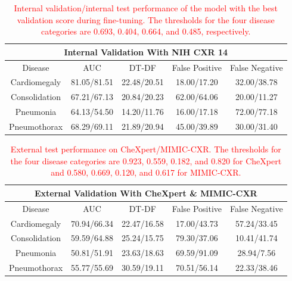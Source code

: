 \documentclass[preprint,7pt, a4paper]{elsarticle}
\begin{document}
\begin{table}
    \centering
    \begin{tabular}{c|cccc}
        \toprule
        \multicolumn{5}{c}{\textbf{Internal Validation With NIH CXR 14}}\\
        \midrule
        Disease & AUC & DT-DF & False Positive & False Negative \\
        \midrule
        Cardiomegaly & 81.05/81.51 & 22.48/20.51 & 18.00/17.20 & 32.00/38.78\\
        Consolidation & 67.21/67.13  & 20.84/20.23 & 62.00/64.06 & 20.00/11.27 \\
        Pneumonia & 64.13/54.50 & 14.20/11.76 & 16.00/17.18 & 72.00/77.18 \\
        Pneumothorax & 68.29/69.11 & 21.89/20.94 & 45.00/39.89 & 30.00/31.40 \\
        \midrule
    \end{tabular}
    \caption{\textcolor{red}{Internal validation/internal test performance of the model with the best validation score during fine-tuning. The thresholds for the four disease categories are 0.693, 0.404, 0.664, and 0.485, respectively.}}
    \label{tab:6}
\end{table}

\begin{table}
    \centering
    \begin{tabular}{c|cccc}
        \toprule
        \multicolumn{5}{c}{\textbf{External Validation With CheXpert \& MIMIC-CXR}}\\
        \midrule
        Disease & AUC & DT-DF & False Positive & False Negative \\
        \midrule
        Cardiomegaly & 70.94/66.34 & 22.47/16.58 & 17.00/43.73 & 57.24/33.45 \\
        Consolidation & 59.59/64.88 & 25.24/15.75 & 79.30/37.06 & 10.41/41.74\\
        Pneumonia & 50.81/51.91 & 23.63/18.63 & 69.59/91.09 & 28.94/7.56 \\
        Pneumothorax & 55.77/55.69 & 30.59/19.11 & 70.51/56.14 & 22.33/38.46 \\
        \midrule
    \end{tabular}
    \caption{\textcolor{red}{External test performance on CheXpert/MIMIC-CXR. The thresholds for the four disease categories are 0.923, 0.559, 0.182, and 0.820 for CheXpert and 0.580, 0.669, 0.120, and 0.617 for MIMIC-CXR.}}
    \label{tab:9}
\end{table}
\end{document}

